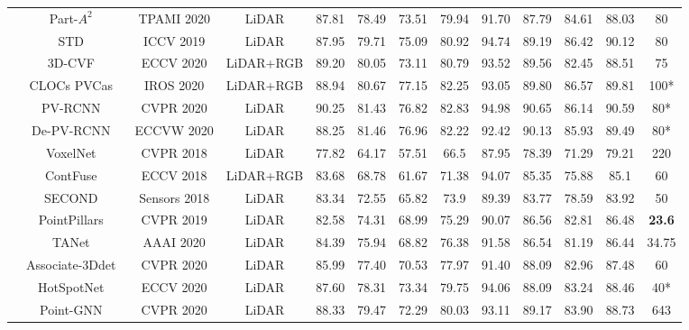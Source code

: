 \documentclass[letterpaper]{article}
\begin{document}
\begin{table*}[t]
\begin{tabular}{c|c|c|c|cccc|cccc|c}
         & Part-$A^2$~\cite{shi2020points}   &TPAMI 2020   & {LiDAR}     & 87.81  & 78.49  & 73.51 &79.94 &91.70  &87.79  &84.61  &88.03 & 80\\
& STD~\cite{yang2019std}            &ICCV 2019   & {LiDAR}     & 87.95  & 79.71  & 75.09 &80.92 &94.74 &89.19 &86.42 & 90.12 & 80\\
         & 3D-CVF~\cite{yoo20203d}           &ECCV 2020   & {LiDAR+RGB}   & 89.20  & 80.05  & 73.11 &80.79 &93.52  &89.56 &82.45  &88.51 & 75\\
         & CLOCs PVCas~\cite{pang2020clocs}  &IROS 2020   & {LiDAR+RGB}     & 88.94  & 80.67  &77.15 &82.25  &93.05  &89.80  &86.57  &89.81 &100*\\
         & PV-RCNN~\cite{shi2020pv}          &CVPR 2020   & {LiDAR}     & 90.25  & 81.43  & 76.82 & 82.83 &94.98  &90.65  &86.14  &90.59 & 80*\\
         & De-PV-RCNN~\cite{2020deformable} &ECCVW 2020   & {LiDAR}     & 88.25  & 81.46  & 76.96 &82.22 &92.42  &90.13  &85.93  &89.49 & 80*\\
      \hline
      \hline
         \parbox[t]{2mm}{}
& VoxelNet~\cite{zhou2018voxelnet} &CVPR 2018   &{LiDAR}      & 77.82  & 64.17  & 57.51 &66.5 &87.95 &78.39 &71.29 &79.21 & 220\\
         & ContFuse~\cite{CONTFUSE}         &ECCV 2018   &{LiDAR+RGB}    & 83.68  & 68.78  & 61.67 &71.38 &94.07 &85.35 &75.88 & 85.1 & 60\\
         & SECOND~\cite{yan2018second}      &Sensors 2018   &{LiDAR}      & 83.34  & 72.55  & 65.82 &73.9 &89.39 &83.77 &78.59 &83.92 & 50\\
         & PointPillars~\cite{lang2019pointpillars}&CVPR 2019   &{LiDAR}      & 82.58  & 74.31  & 68.99 &75.29 &90.07 &86.56 &82.81 &86.48 & \bf 23.6\\
         & TANet~\cite{liu2020tanet}        &AAAI 2020   &{LiDAR}      & 84.39  & 75.94  & 68.82 &76.38 &91.58  &86.54  &81.19  &86.44 & 34.75\\
         & Associate-3Ddet~\cite{du2020associate}&CVPR 2020   &{LiDAR}      & 85.99  & 77.40  & 70.53 &77.97 &91.40  &88.09  &82.96  &87.48 & 60\\
         & HotSpotNet~\cite{chen2019object}  &ECCV 2020   & {LiDAR}      &87.60 &78.31 &73.34 &79.75 &94.06 &88.09 &83.24 & 88.46 & 40*\\
         & Point-GNN~\cite{shi2020point}    &CVPR 2020   &{LiDAR}      & 88.33  & 79.47  & 72.29 &80.03 &93.11  &89.17  &83.90  &88.73 & 643\\

\end{tabular}
\end{table*}
\end{document}
